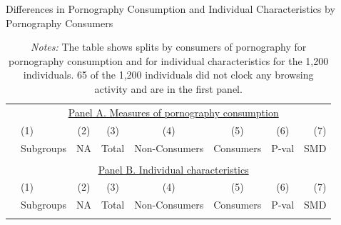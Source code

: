\documentclass[12pt,twoside]{article}
\begin{document}
\iffalse
\begin{table}[ht] \centering \scriptsize \setlength\tabcolsep{6 pt}
	\caption{Differences in Pornography Consumption and Individual Characteristics by Pornography Consumers}
	\label{tab:characteristics_split_by_porn_consumers}
	\begin{adjustbox}{max width=\textwidth}
		\begin{tabular}{@{\hspace{0\tabcolsep}}llrcccrr@{\hspace{0\tabcolsep}}}
			\toprule
			&\multicolumn{7}{c}{\underline{Panel A. Measures of pornography consumption}}\\
			&\multicolumn{1}{l}{(1)}&\multicolumn{1}{c}{(2)}&\multicolumn{1}{c}{(3)}&\multicolumn{1}{c}{(4)}&\multicolumn{1}{c}{(5)}&\multicolumn{1}{c}{(6)}&\multicolumn{1}{r}{(7)}\\			
			&\multicolumn{1}{l}{Subgroups}&\multicolumn{1}{c}{NA}&\multicolumn{1}{c}{Total}&\multicolumn{1}{c}{Non-Consumers}&\multicolumn{1}{c}{Consumers}&\multicolumn{1}{c}{P-val}&\multicolumn{1}{r}{SMD}\\
			\cmidrule{2-8}
			\\
			\cmidrule{2-8}
			&\multicolumn{7}{c}{\underline{Panel B. Individual characteristics}}\\
			&\multicolumn{1}{l}{(1)}&\multicolumn{1}{c}{(2)}&\multicolumn{1}{c}{(3)}&\multicolumn{1}{c}{(4)}&\multicolumn{1}{c}{(5)}&\multicolumn{1}{c}{(6)}&\multicolumn{1}{r}{(7)}\\			
			&\multicolumn{1}{l}{Subgroups}&\multicolumn{1}{c}{NA}&\multicolumn{1}{c}{Total}&\multicolumn{1}{c}{Non-Consumers}&\multicolumn{1}{c}{Consumers}&\multicolumn{1}{c}{P-val}&\multicolumn{1}{r}{SMD}\\
			\cmidrule{2-8}
			\\
			\bottomrule
		\end{tabular}
	\end{adjustbox}
	\caption*{\scriptsize \emph{Notes:}
		The table shows splits by consumers of pornography for pornography consumption and for individual characteristics for the 1,200 individuals.
		65 of the 1,200 individuals did not clock any browsing activity and are in the first panel.
}
\end{table}
\end{document}
